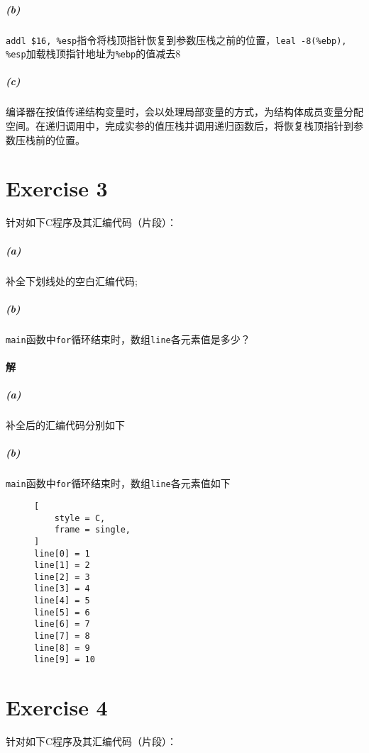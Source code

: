 \documentclass{article}
\newcommand{\CodeBlock}[2]{
    \begin{figure}[H]
        \begin{mdframed}[
            style = Default,
        ]
            
        \end{mdframed}
    \end{figure}
}
\begin{document}
\CodeBlock{Assembler}{./Ex2_N=11_Filled.s}

\subparagraph*{(b)}
\lstinline[style = Assembler]{addl $16, %esp}指令将栈顶指针恢复到参数压栈之前的位置，\lstinline[style = Assembler]{leal -8(%ebp), %esp}加载栈顶指针地址为\lstinline[style = Assembler]{%ebp}的值减去8
\subparagraph{(c)}
编译器在按值传递结构变量时，会以处理局部变量的方式，为结构体成员变量分配空间。在递归调用中，完成实参的值压栈并调用递归函数后，将恢复栈顶指针到参数压栈前的位置。

\FloatBarrier

\section*{Exercise 3}
针对如下C程序及其汇编代码（片段）：

\CodeBlock{C}{./Ex3.c}

\CodeBlock{Assembler}{./Ex3_g.s}

\CodeBlock{Assembler}{./Ex3_main.s}

\subparagraph*{(a)}
补全下划线处的空白汇编代码;
\subparagraph*{(b)}
\texttt{main}函数中\texttt{for}循环结束时，数组\texttt{line}各元素值是多少？

\paragraph{解}
\subparagraph*{(a)}
补全后的汇编代码分别如下

\CodeBlock{Assembler}{./Ex3_g_Filled.s}

\CodeBlock{Assembler}{./Ex3_main_Filled.s}

\subparagraph*{(b)}
\texttt{main}函数中\texttt{for}循环结束时，数组\texttt{line}各元素值如下
\begin{figure}[H]
\begin{lstlisting}[
    style = C,
    frame = single,
]
line[0] = 1
line[1] = 2
line[2] = 3
line[3] = 4
line[4] = 5
line[5] = 6
line[6] = 7
line[7] = 8
line[8] = 9
line[9] = 10
\end{lstlisting}
\end{figure}


\section*{Exercise 4}
针对如下C程序及其汇编代码（片段）：
\end{document}
